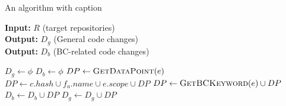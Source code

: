 \documentclass{article}
\begin{document}
\begin{algorithm}
\caption{An algorithm with caption}\label{alg:cap}
\hspace*{2mm} \textbf{Input:} $R$ (target repositories)  \\
\hspace*{2mm} \textbf{Output:} $D_g$ (General code changes) \\
\hspace*{2mm} \textbf{Output:} $D_b$ (BC-related code changes)
\begin{algorithmic}
\State $D_g \leftarrow \phi$
\State $D_b \leftarrow \phi$
                    \State $DP \leftarrow \textsc{GetDataPoint}(e)$
                    \State $DP \leftarrow c.hash \cup f_a.name \cup e.scope \cup DP $
                        \State $DP \leftarrow \textsc{GetBCKeyword}(e) \cup DP $
                        \State $D_b \leftarrow D_b \cup DP$
                    \Else
                        \State $D_g \leftarrow D_g \cup DP$
                    \EndIf
                \EndFor
            \EndFor
        \EndIf
    \EndFor
\EndFor
\end{algorithmic}
\end{algorithm}
\end{document}

